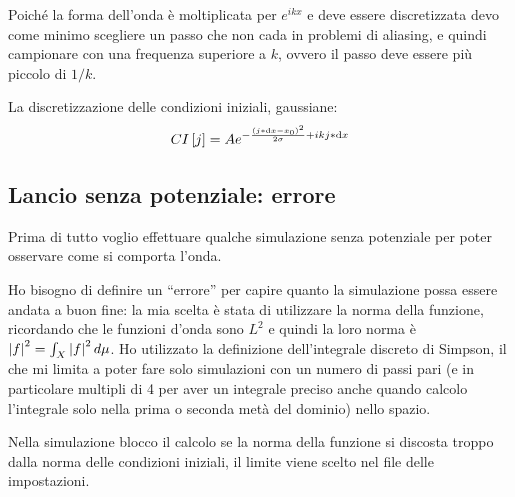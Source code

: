 Poich\'e la forma dell'onda \`e moltiplicata per $e^{ikx}$ e deve essere discretizzata devo come minimo scegliere un passo che non cada in problemi di aliasing, e quindi campionare con una frequenza superiore a $k$, ovvero il passo deve essere pi\`u piccolo di $1/k$.

La discretizzazione delle condizioni iniziali, gaussiane:
\begin{equation}
  CI\lrq{j}= Ae^{-\frac{\lrt{j*\df x-x_0}^2}{2\sigma}+i k j*\df x}
\end{equation}

\subsection{Lancio senza potenziale: errore}\label{sec:errore}
Prima di tutto voglio effettuare qualche simulazione senza potenziale per poter osservare come si comporta l'onda.

Ho bisogno di definire un ``errore'' per capire quanto la simulazione possa essere andata a buon fine:
la mia scelta \`e stata di utilizzare la norma della funzione, ricordando che le funzioni d'onda sono $L^2$ e quindi la loro norma \`e  $\lr||f^2=\int_X\lr||f^2d\mu$.
Ho utilizzato la definizione dell'integrale discreto di Simpson, il che mi limita a poter fare solo simulazioni con un numero di passi pari (e in particolare multipli di 4 per aver un integrale preciso anche quando calcolo l'integrale solo nella prima o seconda met\`a del dominio) nello spazio.

Nella simulazione blocco il calcolo se la norma della funzione si discosta troppo dalla norma delle condizioni iniziali, il limite viene scelto nel file delle impostazioni.

